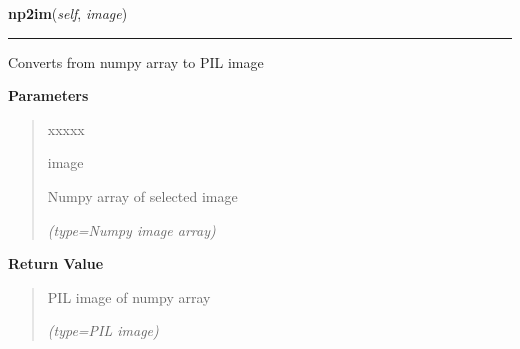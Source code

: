 \hspace{.8\funcindent}\begin{boxedminipage}{\funcwidth}

    \raggedright \textbf{np2im}(\textit{self}, \textit{image})

    \vspace{-1.5ex}

    \rule{\textwidth}{0.5\fboxrule}
\setlength{\parskip}{2ex}
    Converts from numpy array to PIL image

\setlength{\parskip}{1ex}
      \textbf{Parameters}
      \vspace{-1ex}

      \begin{quote}
        \begin{Ventry}{xxxxx}

          \item[image]

          Numpy array of selected image

            {\it (type=Numpy image array)}

        \end{Ventry}

      \end{quote}

      \textbf{Return Value}
    \vspace{-1ex}

      \begin{quote}
      PIL image of numpy array

      {\it (type=PIL image)}

      \end{quote}

    \end{boxedminipage}

    \label{client_gui:GuiClass:im2tk}

    \vspace{0.5ex}

